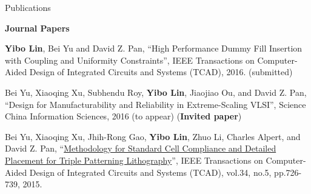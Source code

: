 \begin{rSection}{Publications}

\textbf{Journal Papers}
\begin{description}[font=\normalfont]
\item[{[J3]}]{
        \textbf{Yibo Lin}, Bei Yu and David Z. Pan, 
    ``High Performance Dummy Fill Insertion with Coupling and Uniformity Constraints'', 
    IEEE Transactions on Computer-Aided Design of Integrated Circuits and Systems (TCAD), 2016.
    (submitted)
}
\item[{[J2]}]{
        Bei Yu, Xiaoqing Xu, Subhendu Roy, \textbf{Yibo Lin}, Jiaojiao Ou, and David Z. Pan, 
        ``Design for Manufacturability and Reliability in Extreme-Scaling VLSI'', 
        Science China Information Sciences, 2016 
        (to appear)
        (\textbf{Invited paper})
}
\item[{[J1]}]{
        Bei Yu, Xiaoqing Xu, Jhih-Rong Gao, \textbf{Yibo Lin}, Zhuo Li, Charles Alpert, and David Z. Pan, 
        ``\href{http://ieeexplore.ieee.org/xpl/articleDetails.jsp?tp=&arnumber=7036058}{Methodology for Standard Cell Compliance and Detailed Placement for Triple Patterning Lithography}'', 
        IEEE Transactions on Computer-Aided Design of Integrated Circuits and Systems (TCAD), vol.34, no.5, pp.726-739, 2015. 
}
\end{description}



\end{rSection}
